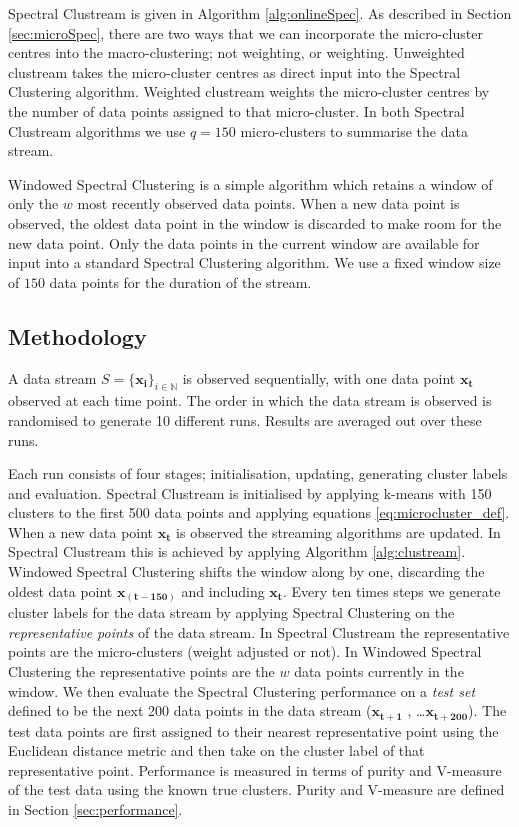Spectral Clustream is given in Algorithm \ref{alg:onlineSpec}. As described in Section \ref{sec:microSpec}, there are two  ways that we can incorporate the micro-cluster centres into the macro-clustering; not weighting, or weighting. Unweighted clustream takes the micro-cluster centres as direct input into the Spectral Clustering algorithm. Weighted clustream weights the micro-cluster centres by the number of data points assigned to that micro-cluster. In both Spectral Clustream algorithms we use $q = 150$ micro-clusters to summarise the data stream.

Windowed Spectral Clustering is a simple algorithm which retains a window of only the  $w$  most recently observed data points. When a new data point is observed, the oldest data point in the window is discarded to make room for the new data point. Only the data points in the current window are available for input into a standard Spectral Clustering algorithm. We use a fixed window size of $150$ data points for the duration of the stream.

\subsection{Methodology}
\label{sec:methodology}
A data stream $S = \{ \boldsymbol{x_i} \}_{i \in \mathbb{N}}$ is observed sequentially, with one data point $\boldsymbol{x_t}$ observed at each time point.  The order in which the data stream is observed is randomised to generate 10 different runs.  Results are averaged out over these runs. 

Each run consists of four stages; initialisation, updating,  generating cluster labels and evaluation. Spectral Clustream is initialised by applying k-means with 150 clusters to the first 500 data points and applying equations \eqref{eq:microcluster_def}. When a new data point  $\boldsymbol{x_t}$ is observed the streaming algorithms are updated. In Spectral Clustream this is achieved by applying Algorithm \ref{alg:clustream}. Windowed Spectral Clustering shifts the window along by one, discarding the oldest data point $\boldsymbol{x_{(t-150)}}$ and including $\boldsymbol{x_t}$. Every ten times steps we generate cluster labels for the data stream by applying Spectral Clustering on the \textit{representative points} of the data stream. In Spectral Clustream the representative points are the micro-clusters (weight adjusted or not). In Windowed Spectral Clustering the representative points are the $w$ data points currently in the window. We then evaluate the Spectral Clustering performance on a \textit{test set} defined  to be the next 200 data points in the data stream ($\boldsymbol{x_{t+1}}$ , \ldots  $\boldsymbol{x_{t+200}}$). The test data points are first assigned to their nearest representative point using the Euclidean distance metric and then take on the cluster label of that representative point. Performance is measured in terms of purity and V-measure of the test data using the known true clusters. Purity and V-measure are defined in Section \ref{sec:performance}.

